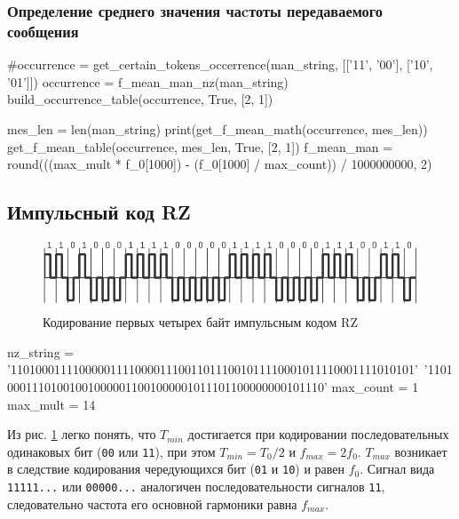 \documentclass[12pt, a4paper]{article}
\begin{document}
\subsubsection*{Определение среднего значения чаcтоты передаваемого сообщения}

\begin{pycode}
#occurrence = get_certain_tokens_occerrence(man_string, [['11', '00'], ['10', '01']])
occurrence = f_mean_man_nz(man_string)
build_occurrence_table(occurrence, True, [2, 1])

mes_len = len(man_string)
print(get_f_mean_math(occurrence, mes_len))
get_f_mean_table(occurrence, mes_len, True, [2, 1])
f_mean_man = round(((max_mult * f_0[1000]) - (f_0[1000] / max_count)) / 1000000000, 2)
\end{pycode}

\newpage

\subsection{Импульсный код RZ}

\begin{figure}[h]
  \begin{center}
    \includegraphics{rz}
    \caption{Кодирование первых четырех байт импульсным кодом RZ}
    \label{fig:rz}
  \end{center}
\end{figure}

\begin{pycode}
nz_string = '11010001111000001111000011100110111001011110001011110001111010101'\
  '1101000111010010010000011001000001011101100000000101110'
max_count = 1
max_mult = 14
\end{pycode}

Из рис. \ref{fig:rz} легко понять, что $T_{min}$ достигается при кодировании последовательных
одинаковых бит (\texttt{00} или \texttt{11}), при этом $T_{min} = T_0 / 2$ 
и $f_{max} = 2 f_0$. $T_{max}$ возникает в следствие кодирования чередующихся
бит (\texttt{01} и \texttt{10}) и равен $f_0$. Сигнал вида \texttt{11111...} или
\texttt{00000...} аналогичен последовательности сигналов \texttt{11}, следовательно
частота его основной гармоники равна $f_{max}$.
\end{document}
